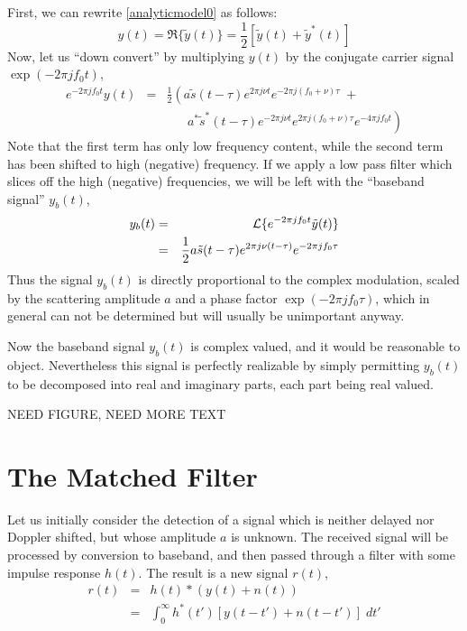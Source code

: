 First, we can rewrite \eqref{analyticmodel0} as follows:
\begin{equation}
y(t) = \Re\{ \tilde{y}(t) \} = 
            \frac{1}{2}\left[\tilde{y}(t) + \tilde{y}^\ast(t)\right] 
\end{equation}
Now, let us ``down convert'' by multiplying $y(t)$ by the conjugate
carrier signal $\exp(-2\pi j f_0 t)$,
\begin{eqnarray}
e^{-2\pi j f_0 t} y(t) &=&
\frac{1}{2} \left(
  a \tilde{s}(t - \tau) e^{2\pi j \nu t} e^{- 2\pi j (f_0 + \nu) \tau}
  \; + \right.  \nonumber
\\
& & \;\;\;\;\;\; \left.a^\ast \tilde{s}^\ast(t - \tau) e^{-2\pi j \nu t} 
   e^{2\pi j(f_0 + \nu) \tau} e^{-4\pi j f_0 t} \right)
\end{eqnarray}
Note that the first term has only low frequency content, while the
second term has been shifted to high (negative) frequency.  If we
apply a low pass filter which slices off the high (negative)
frequencies, we will be left with the ``baseband signal'' $y_b(t)$,
\begin{eqnarray}
y_b(t) &=& {\cal L}\{e^{-2\pi j f_0 t} \tilde{y}(t)\} \\
       &=& \frac{1}{2}a \tilde{s}(t - \tau) e^{2\pi j \nu (t-\tau)} e^{- 2\pi
       j f_0 \tau} 
\end{eqnarray}
Thus the signal $y_b(t)$ is directly proportional to the complex
modulation, scaled by the scattering amplitude $a$ and a phase factor
$\exp(-2\pi j f_0 \tau)$, which in general can not be determined but
will usually be unimportant anyway.

Now the baseband signal $y_b(t)$ is complex valued, and it would be
reasonable to object.  Nevertheless this signal is perfectly
realizable by simply permitting $y_b(t)$ to be decomposed into real
and imaginary parts, each part being real valued.

NEED FIGURE, NEED MORE TEXT

\section{The Matched Filter}

Let us initially consider the detection of a signal which is neither
delayed nor Doppler shifted, but whose amplitude $a$ is unknown.  The
received signal will be processed by conversion to baseband, and then
passed through a filter with some impulse response $h(t)$.  The result
is a new signal $r(t)$,
\begin{eqnarray}
r(t) &=& h(t) \ast (y(t) + n(t)) \\
     &=& \int_0^\infty h^\ast(t') [y(t-t') + n(t-t')]\; dt'
\end{eqnarray}





